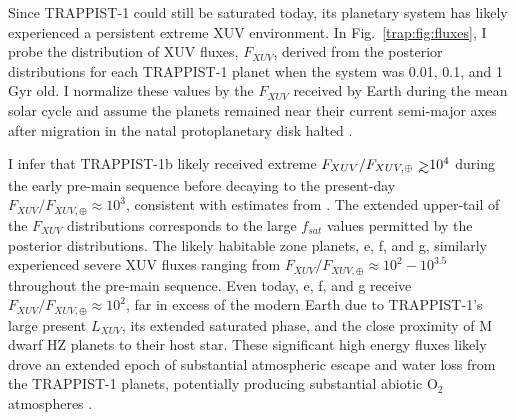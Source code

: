 Since TRAPPIST-1 could still be saturated today, its planetary system has likely experienced a persistent extreme XUV environment. In Fig.~\ref{trap:fig:fluxes}, I probe the distribution of XUV fluxes, $F_{XUV}$, derived from the posterior distributions for each TRAPPIST-1 planet when the system was 0.01, 0.1, and 1 Gyr old. I normalize these values by the $F_{XUV}$ received by Earth during the mean solar cycle \citep[$F_{XUV,\oplus} = 3.88$ erg s$^{-1}$cm$^{-2}$,][]{Ribas2005} and assume the planets remained near their current semi-major axes after migration in the natal protoplanetary disk halted \citep{Luger2017}. 

I infer that TRAPPIST-1b likely received extreme $F_{XUV}/F_{XUV, \oplus} \gsim 10^4$ during the early pre-main sequence before decaying to the present-day $F_{XUV}/F_{XUV, \oplus} \approx 10^3$, consistent with estimates from \citet{Wheatley2017}. The extended upper-tail of the $F_{XUV}$ distributions corresponds to the large $f_{sat}$ values permitted by the posterior distributions. The likely habitable zone planets, e, f, and g, similarly experienced severe XUV fluxes ranging from $F_{XUV}/F_{XUV, \oplus} \approx 10^2 - 10^{3.5}$ throughout the pre-main sequence. Even today, e, f, and g receive $F_{XUV}/F_{XUV, \oplus} \approx 10^2$, far in excess of the modern Earth due to TRAPPIST-1's large present $L_{XUV}$, its extended saturated phase, and the close proximity of M dwarf HZ planets to their host star. These significant high energy fluxes likely drove an extended epoch of substantial atmospheric escape and water loss from the TRAPPIST-1 planets, potentially producing substantial abiotic O$_2$ atmospheres \citep{Luger2015,Bolmont2017,Bourrier2017a}.

